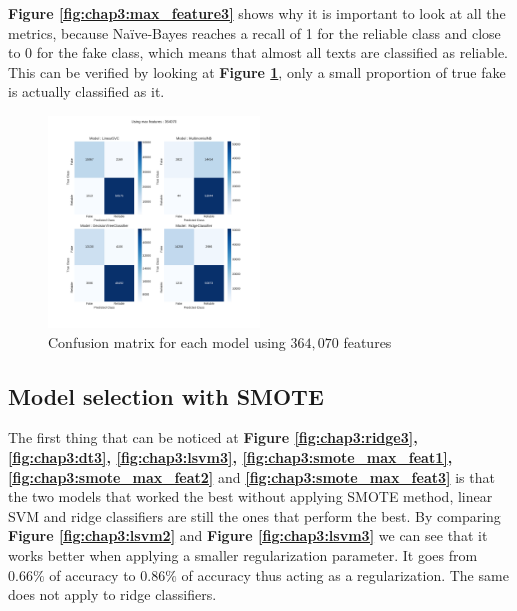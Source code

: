 \textbf{Figure \ref{fig:chap3:max_feature3}} shows why it is important to look at all the metrics, because Na\"{i}ve-Bayes reaches a recall of 1 for the reliable class and close to 0 for the fake class, which means that almost all texts are classified as reliable. This can be verified by looking at \textbf{Figure \ref{fig:chap3:confMat1}}, only a small proportion of true fake is actually classified as it.
\begin{figure}
 \centering
 \includegraphics[width=0.5\textwidth]{images/chapitre3/confMat_fake_364070}
 \caption{Confusion matrix for each model using $364,070$ features}
 \label{fig:chap3:confMat1}
\end{figure}
\subsection{Model selection with SMOTE}
The first thing that can be noticed at \textbf{Figure \ref{fig:chap3:ridge3}, \ref{fig:chap3:dt3}, \ref{fig:chap3:lsvm3}, \ref{fig:chap3:smote_max_feat1}, \ref{fig:chap3:smote_max_feat2}} and \textbf{\ref{fig:chap3:smote_max_feat3}} is that the two models that worked the best without applying SMOTE method, linear SVM and ridge classifiers are still the ones that perform the best. By comparing \textbf{Figure \ref{fig:chap3:lsvm2}} and \textbf{Figure \ref{fig:chap3:lsvm3}} we can see that it works better when applying a smaller regularization parameter. It goes from $0.66\%$ of accuracy to  $0.86\%$ of accuracy thus acting as a regularization. The same does not apply to ridge classifiers. \\

